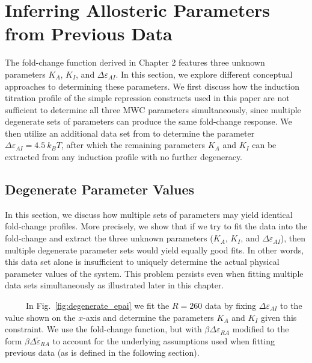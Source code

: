 \documentclass[12pt]{caltech_thesis}
\begin{document}
\hypertarget{inferring-allosteric-parameters-from-previous-data}{%
\section{Inferring Allosteric Parameters from Previous
Data}\label{inferring-allosteric-parameters-from-previous-data}}

The fold-change function derived in Chapter 2 features three unknown
parameters \(K_A\), \(K_I\), and \(\Delta\varepsilon_{AI}\). In this
section, we explore different conceptual approaches to determining these
parameters. We first discuss how the induction titration profile of the
simple repression constructs used in this paper are not sufficient to
determine all three MWC parameters simultaneously, since multiple
degenerate sets of parameters can produce the same fold-change response.
We then utilize an additional data set from \textcite{brewster2014} to
determine the parameter \(\Delta\varepsilon_{AI} = 4.5~k_BT\), after
which the remaining parameters \(K_A\) and \(K_I\) can be extracted from
any induction profile with no further degeneracy.

\hypertarget{degenerate-parameter-values}{%
\subsection{Degenerate Parameter
Values}\label{degenerate-parameter-values}}

In this section, we discuss how multiple sets of parameters may yield
identical fold-change profiles. More precisely, we show that if we try
to fit the data into the fold-change and extract the three unknown
parameters (\(K_A\), \(K_I\), and \(\Delta\varepsilon_{AI}\)), then
multiple degenerate parameter sets would yield equally good fits. In
other words, this data set alone is insufficient to uniquely determine
the actual physical parameter values of the system. This problem
persists even when fitting multiple data sets simultaneously as
illustrated later in this chapter.

~~~~~In Fig.~\ref{fig:degenerate_epai} we fit the \(R=260\) data by
fixing \(\Delta\varepsilon_{AI}\) to the value shown on the \(x\)-axis
and determine the parameters \(K_A\) and \(K_I\) given this constraint.
We use the fold-change function, but with
\(\beta \Delta\varepsilon_{RA}\) modified to the form
\(\beta \Delta\tilde{\varepsilon}_{RA}\) to account for the underlying
assumptions used when fitting previous data (as is defined in the
following section).
\end{document}
